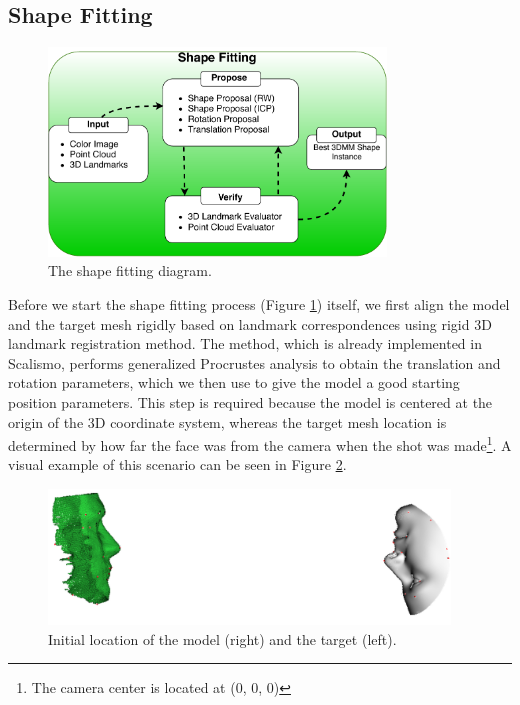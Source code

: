 \subsection{Shape Fitting}\label{s3.4.2}

\begin{figure}[h!]
  \centering
  \includegraphics[width=0.8\textwidth]{Figures/ShapeFitting.pdf}
  \caption{The shape fitting diagram.}
  \label{shapeF}
\end{figure}
\FloatBarrier

Before we start the shape fitting process (Figure \ref{shapeF}) itself, we first align the model and the target mesh rigidly based on landmark correspondences using rigid 3D landmark registration method. The method, which is already implemented in Scalismo, performs generalized Procrustes analysis\cite{Lorusso:1995:CFA:236190.236213} to obtain the translation and rotation parameters, which we then use to give the model a good starting position parameters. This step is required because the model is centered at the origin of the 3D coordinate system, whereas the target mesh location is determined by how far the face was from the camera when the shot was made\footnote{The camera center is located at (0, 0, 0)}. A visual example of this scenario can be seen in Figure \ref{f3.12}. 

\begin{figure}
  \centering
  \includegraphics[width=0.95\textwidth]{Figures/Pictures/modelTargetDist_t.png}
  \caption{Initial location of the model (right) and the target (left).}
  \label{f3.12}
\end{figure}

